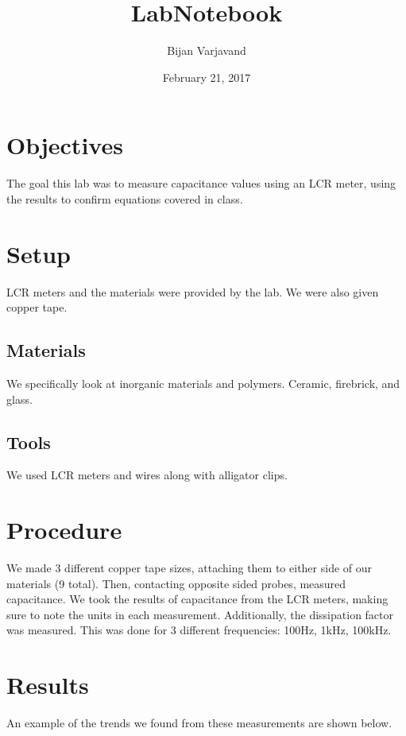 \documentclass{article}
\author{Bijan Varjavand}
\title{LabNotebook}
\date{February 21, 2017}
\begin{document}
\maketitle

\section{Objectives}

The goal this lab was to measure capacitance values using an LCR meter, using the results to confirm equations covered in class.

\section{Setup}

LCR meters and the materials were provided by the lab. We were also given copper tape.
\subsection{Materials}

We specifically look at inorganic materials and polymers. Ceramic, firebrick, and glass.
\subsection{Tools}

We used LCR meters and wires along with alligator clips.
\section{Procedure}

We made 3 different copper tape sizes, attaching them to either side of our materials (9 total). Then, contacting opposite sided probes, measured capacitance. We took the results of capacitance from the LCR meters, making sure to note the units in each measurement. Additionally, the dissipation factor was measured. This was done for 3 different frequencies: 100Hz, 1kHz, 100kHz.

\section{Results}

An example of the trends we found from these measurements are shown below.
\end{document}
